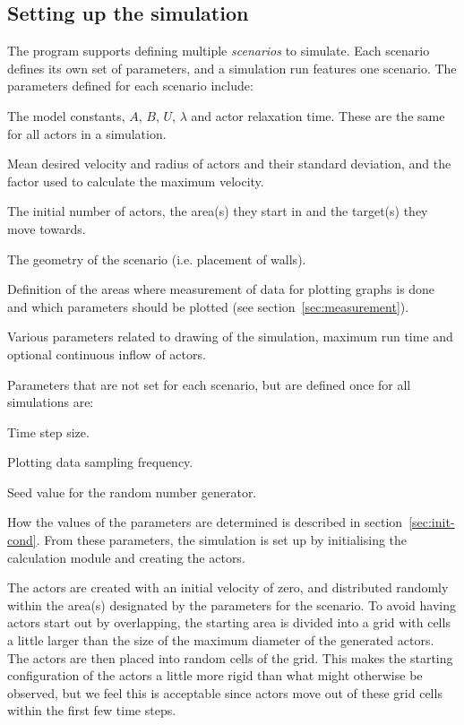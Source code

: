 \subsection{Setting up the simulation}
The program supports defining multiple \emph{scenarios} to simulate. Each 
scenario defines its own set of parameters, and a simulation run features one 
scenario. The parameters defined for each scenario include:

\begin{itemize*}
    \item The model constants, $A$, $B$, $U$, $\lambda$ and actor relaxation 
        time. These are the same for all actors in a simulation.
    \item Mean desired velocity and radius of actors and their standard 
        deviation, and the factor used to calculate the maximum velocity.
    \item The initial number of actors, the area(s) they start in and the 
        target(s) they move towards.
    \item The geometry of the scenario (i.e. placement of walls).
    \item Definition of the areas where measurement of data for plotting 
        graphs is done and which parameters should be plotted (see 
        section~\ref{sec:measurement}).
    \item Various parameters related to drawing of the simulation, maximum run 
        time and optional continuous inflow of actors.
\end{itemize*}

Parameters that are not set for each scenario, but are defined once for all 
simulations are:

\begin{itemize*}
    \item Time step size.
    \item Plotting data sampling frequency.
    \item Seed value for the random number generator.
\end{itemize*}

How the values of the parameters are determined is described in 
section~\ref{sec:init-cond}. From these parameters, the simulation is set up 
by initialising the calculation module and creating the actors.

The actors are created with an initial velocity of zero, and distributed 
randomly within the area(s) designated by the parameters for the scenario. To 
avoid having actors start out by overlapping, the starting area is divided 
into a grid with cells a little larger than the size of the maximum diameter 
of the generated actors. The actors are then placed into random cells of the 
grid. This makes the starting configuration of the actors a little more rigid 
than what might otherwise be observed, but we feel this is acceptable since 
actors move out of these grid cells within the first few time steps.

